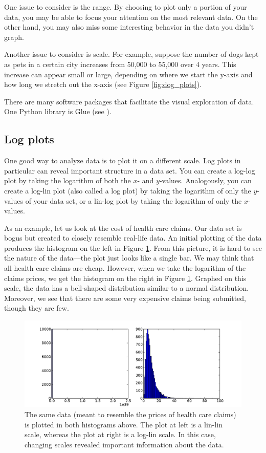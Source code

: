 One issue to consider is the range. 
By choosing to plot only a portion of your data, you may be able to focus your attention on the most relevant data. 
On the other hand, you may also miss some interesting behavior in the data you didn't graph.

Another issue to consider is scale. 
For example, suppose the number of dogs kept as pets in a certain city increases from 50,000 to 55,000 over 4 years. 
This increase can appear small or large, depending on where we start the y-axis and how long we stretch out the x-axis (see Figure \ref{fig:dog_plots}).

There are many software packages that facilitate the visual exploration of data. 
One Python library is Glue (see \cite{glue}).


\subsection*{Log plots}

One good way to analyze data is to plot it on a different scale. 
Log plots in particular can reveal important structure in a data set. 
You can create a log-log plot by taking the logarithm of both the $x$- and $y$-values. 
Analogously, you can create a log-lin plot (also called a log plot) by taking the logarithm of only the $y$-values of your data set, or a lin-log plot by taking the logarithm of only the $x$-values.

As an example, let us look at the cost of health care claims. 
Our data set is bogus but created to closely resemble real-life data. 
An initial plotting of the data produces the histogram on the left in Figure \ref{fig:healthcare}. 
From this picture, it is hard to see the nature of the data---the plot just looks like a single bar. 
We may think that all health care claims are cheap. 
However, when we take the logarithm of the claims prices, we get the histogram on the right in Figure \ref{fig:healthcare}. 
Graphed on this scale, the data has a bell-shaped distribution similar to a normal distribution. 
Moreover, we see that there are some very expensive claims being submitted, though they are few. 

\begin{figure}
\centering
\includegraphics[width=\textwidth]{healthcare.pdf}
\caption{The same data (meant to resemble the prices of health care claims) is plotted in both histograms above. 
The plot at left is a lin-lin scale, whereas the plot at right is a log-lin scale. 
In this case, changing scales revealed important information about the data.}
\label{fig:healthcare}
\end{figure}

